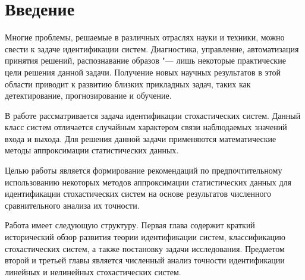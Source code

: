 \chapter*{Введение}

Многие проблемы, решаемые в различных отраслях науки и техники,
можно свести к задаче идентификации систем.
Диагностика, управление, автоматизация принятия решений, распознавание образов
"--- лишь некоторые практические цели решения данной задачи.
Получение новых научных результатов в этой области приводит к
развитию близких прикладных задач,
таких как детектирование, прогнозирование и обучение.

В работе рассматривается задача идентификации стохастических систем.
Данный класс систем отличается случайным характером связи наблюдаемых
значений входа и выхода.
Для решения данной задачи применяются математические методы
аппроксимации статистических данных.

Целью работы является формирование рекомендаций по предпочтительному использованию
некоторых методов аппроксимации статистических данных для идентификации стохастических
систем на основе результатов численного сравнительного анализа их точности.

Работа имеет следующую структуру.
Первая глава содержит краткий исторический обзор развития теории идентификации систем,
классификацию стохастических систем, а также постановку задачи исследования.
Предметом второй и третьей главы является численный анализ точности идентификации
линейных и нелинейных стохастических систем.
